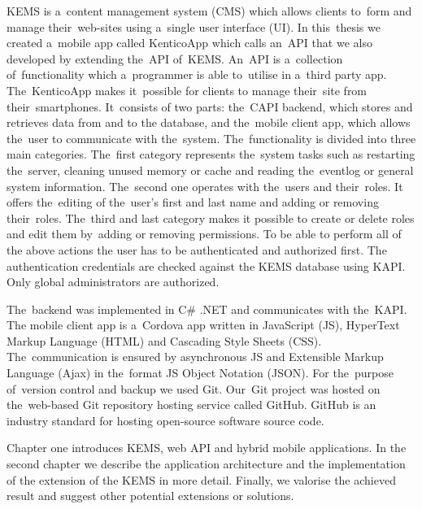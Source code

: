 \label{introduction}
KEMS is a~content management system (CMS) which allows clients to~form and manage their~web-sites using a~single user interface (UI). In this~thesis we created a~mobile app called KenticoApp which calls an~API that we also developed by extending the~API of~KEMS. An~API is a~collection of~functionality which a~programmer is able to~utilise in a~third party app. The~KenticoApp makes it~possible for clients to manage their~site from their~smartphones. It~consists of two parts: the~CAPI backend, which stores and retrieves data from and to the database, and the~mobile client app, which allows the~user to communicate with the~system.  The~functionality is divided into three main categories. The~first category represents the~system tasks such as restarting the~server, cleaning unused memory or cache and reading the~eventlog or general system information. The~second one operates with the~users and their~roles. It offers the~editing of the~user's first and last name and adding or removing their~roles. The~third and last category makes it possible to create or delete roles and edit them by~adding or removing permissions. To be able to perform all of the above actions the user has to be authenticated and authorized first. The authentication credentials are checked against the KEMS database using KAPI. Only global administrators are authorized.

The~backend was implemented in C\# .NET and communicates with the~KAPI. The mobile client app is a~Cordova app written in JavaScript (JS), HyperText Markup Language (HTML) and Cascading Style Sheets (CSS). The~communication is ensured by asynchronous JS and Extensible Markup Language (Ajax) in the~format JS Object Notation (JSON). For the~purpose of~version control and backup we used Git. Our~Git project was hosted on the~web-based Git repository hosting service called GitHub. GitHub is an industry standard for hosting open-source software source code. 

Chapter one introduces KEMS, web API and hybrid mobile applications. In the second chapter we describe the application architecture and the implementation of the extension of the KEMS in more detail. Finally, we valorise the achieved result and suggest other potential extensions or solutions.
